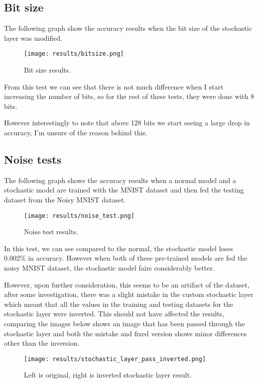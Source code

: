 \documentclass[a4paper,oneside,phd,etd]{BYUPhys}
\begin{document}

\subsection{Bit size}
The following graph show the accuracy results when the bit size of the stochastic layer was modified.
\begin{figure}[H]
\centering
\texttt{[image: results/bitsize.png]}
\caption{Bit size results.}
\label{fig:bitsize}
\end{figure}
From this test we can see that there is not much difference when I start increasing the number of bits, so for the rest of these tests, they were done with 8 bits.

However interestingly to note that above 128 bits we start seeing a large drop in accuracy, I'm unsure of the reason behind this.

\subsection{Noise tests}
The following graph shows the accuracy results when a normal model and a stochastic model are trained with the MNIST dataset and then fed the testing dataset from the Noisy MNIST dataset.
\begin{figure}[H]
\centering
\texttt{[image: results/noise\_test.png]}
\caption{Noise test results.}
\label{fig:noise}
\end{figure}
In this test, we can see compared to the normal, the stochastic model loses 0.002\% in accuracy. However when both of these pre-trained models are fed the noisy MNIST dataset, the stochastic model fairs considerably better.

However, upon further consideration, this seems to be an artifact of the dataset, after some investigation, there was a slight mistake in the custom stochastic layer which meant that all the values in the training and testing datasets for the stochastic layer were inverted. 
This should not have affected the results, comparing the images below shows an image that has been passed through the stochastic layer and both the mistake and fixed version shows minor differences other than the inversion.
\begin{figure}[H]
\centering
\texttt{[image: results/stochastic\_layer\_pass\_inverted.png]}
\caption{Left is original, right is inverted stochastic layer result.}
\label{fig:noise_stochastic_inverted}
\end{figure}
\end{document}

